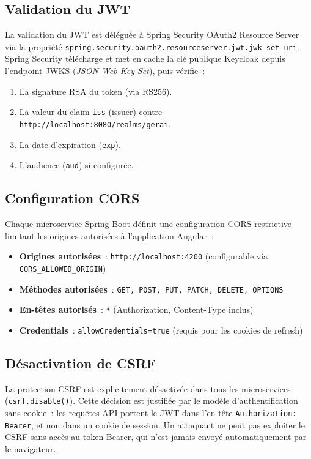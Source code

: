 \subsection{Validation du JWT}

La validation du JWT est déléguée à Spring Security OAuth2 Resource Server via
la propriété \texttt{spring.security.oauth2.resourceserver.jwt.jwk-set-uri}.
Spring Security télécharge et met en cache la clé publique Keycloak depuis
l'endpoint JWKS (\textit{JSON Web Key Set}), puis vérifie~:

\begin{enumerate}[leftmargin=*,nosep]
  \item La signature RSA du token (via RS256).
  \item La valeur du claim \texttt{iss} (issuer) contre \texttt{http://localhost:8080/realms/gerai}.
  \item La date d’expiration (\texttt{exp}).
  \item L'audience (\texttt{aud}) si configurée.
\end{enumerate}

\subsection{Configuration CORS}

Chaque microservice Spring Boot définit une configuration CORS restrictive
limitant les origines autorisées à l’application Angular~:

\begin{itemize}[leftmargin=*,nosep]
  \item \textbf{Origines autorisées}~: \texttt{http://localhost:4200} (configurable via \texttt{CORS\_ALLOWED\_ORIGIN})
  \item \textbf{Méthodes autorisées}~: \texttt{GET, POST, PUT, PATCH, DELETE, OPTIONS}
  \item \textbf{En-têtes autorisés}~: \texttt{*} (Authorization, Content-Type inclus)
  \item \textbf{Credentials}~: \texttt{allowCredentials=true} (requis pour les cookies de refresh)
\end{itemize}

\subsection{Désactivation de CSRF}\label{sec:csrf}

La protection CSRF est explicitement désactivée dans tous les microservices
(\texttt{csrf.disable()}). Cette décision est justifiée par le modèle
d’authentification sans cookie~: les requêtes API portent le JWT dans l'en-tête
\texttt{Authorization: Bearer}, et non dans un cookie de session. Un attaquant
ne peut pas exploiter le CSRF sans accès au token Bearer, qui n’est jamais envoyé
automatiquement par le navigateur.

